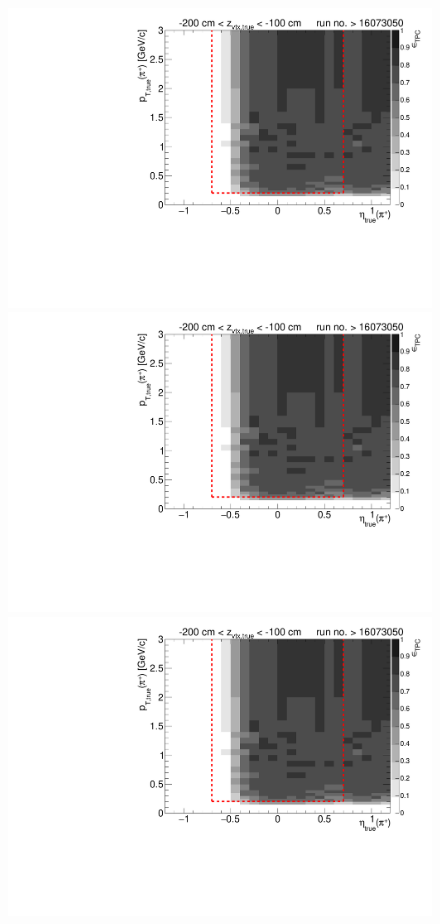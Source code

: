 \begin{figure}[hb]\ContinuedFloat
	\centering
	\parbox{0.495\textwidth}{
		\centering
		\includegraphics[width=\linewidth,page=11]{graphics/eff/Eff2D_TPC_pion_Plus_RunRange2.pdf}\\
		\includegraphics[width=\linewidth,page=13]{graphics/eff/Eff2D_TPC_pion_Plus_RunRange2.pdf}\\
		\includegraphics[width=\linewidth,page=15]{graphics/eff/Eff2D_TPC_pion_Plus_RunRange2.pdf}\\
}
\end{figure}
